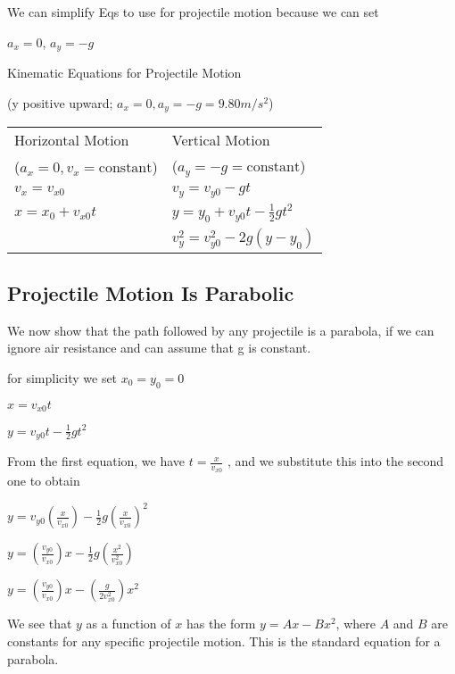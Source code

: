 \documentclass{extarticle}
\begin{document}
We can simplify Eqs to use for projectile motion because we can set

$a_x = 0$, $a_y = -g$


Kinematic Equations for Projectile Motion

(y positive upward; $a_x = 0, a_y = -g = 9.80 m/s^2$)




\begin{tabu}{XX}
Horizontal Motion & 
Vertical Motion \\
($a_x = 0, v_x = \text{constant}$) &
($a_y = -g = \text{constant}$) \\
\hline
$v_x = v_{x0}$ &
$v_y = v_{y0} - gt$ \\

$x = x_0 + v_{x0}t $ & 
$y = y_0 + v_{y0}t - \frac{1}{2}gt^2$ \\

 & 
$v_y^2 = v_{y0}^2 - 2g(y - y_0)$ \\ \hline
\end{tabu}




\subsection{Projectile Motion Is Parabolic}

 We now show that the path followed by any projectile is a parabola, if we can ignore air resistance and can assume that g is constant. 
 
 for simplicity we set $x_0 = y_0 = 0$
 
 
$x = v_{x0}t $

$y = v_{y0}t - \frac{1}{2}gt^2$ 
 
From the first equation, we have $t = \frac{x}{v_{x0}}$ , and we substitute this into the second one to obtain
 
$y = v_{y0}(\frac{x}{v_{x0}}) - \frac{1}{2}g(\frac{x}{v_{x0}})^2$ 

$y = (\frac{v_{y0}}{v_{x0}})x - \frac{1}{2}g(\frac{x^2}{v_{x0}^2})$ 

$y = (\frac{v_{y0}}{v_{x0}})x - (\frac{g}{2v_{x0}^2})x^2$

We see that $y$ as a function of $x$ has the form $y = Ax - Bx^2$, where $A$ and $B$ are constants for any specific projectile motion. This is the standard equation for a parabola.
\end{document}
